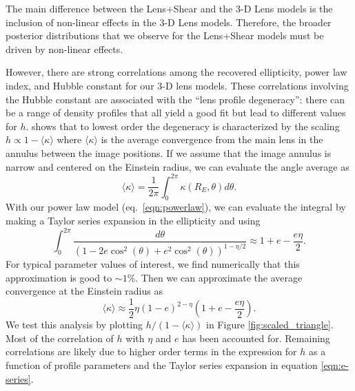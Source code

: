 \documentclass{emulateapj}
\begin{document}
The main difference between the Lens+Shear and the 3-D Lens models is the inclusion of non-linear effects in the 3-D Lens models. Therefore, the broader posterior distributions that we observe for the Lens+Shear models must be driven by non-linear effects.

However, there are strong correlations among the recovered ellipticity, power law index, and Hubble constant for our 3-D lens models. These correlations involving the Hubble constant are associated with the ``lens profile degeneracy'':  there can be a range of density profiles that all yield a good fit but lead to different values for $h$.  \citet{Kochanek02} shows that to lowest order the degeneracy is characterized by the scaling $h \propto 1 - \langle \kappa \rangle$ where $\langle \kappa \rangle$ is the average convergence from the main lens in the annulus between the image positions.  If we assume that the image annulus is narrow and centered on the Einstein radius, we can evaluate the angle average as
\begin{equation}
\langle \kappa \rangle = \frac{1}{2 \pi} \int_{0}^{2 \pi} \kappa(R_E, \theta) d \theta.
\end{equation}
With our power law model (eq.\ \ref{eqn:powerlaw}), we can evaluate the integral by making a Taylor series expansion in the ellipticity and using
\begin{equation}\label{eqn:e-series}
\int_0^{2 \pi} \frac{d \theta}{ (1 - 2 e \cos^2(\theta) + e^2\cos^2(\theta))^{1 - \eta / 2}} \approx 1 + e  - \frac{ e \eta}{2}.
\end{equation}
For typical parameter values of interest, we find numerically that this approximation is good to $\sim1\%$.  Then we can approximate the average convergence at the Einstein radius as
\begin{equation}\label{eqn:kappa-avg}
\langle \kappa \rangle \approx \frac{1}{2} \eta  (1 - e)^{2 - \eta} \left(1 +  e - \frac{e \eta }{2}\right).
\end{equation}
We test this analysis by plotting $h/(1-\langle\kappa\rangle)$ in Figure \ref{fig:scaled_triangle}.  Most of the correlation of $h$ with $\eta$ and $e$ has been accounted for.  Remaining correlations are likely due to higher order terms in the expression for $h$ as a function of profile parameters \citep{Kochanek02} and the Taylor series expansion in equation \ref{eqn:e-series}.
\end{document}
